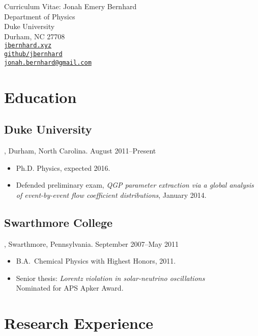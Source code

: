 \documentclass[letterpaper,10pt]{article}
\begin{document}
\begin{center}
  \Large
  Curriculum Vitae:  Jonah Emery Bernhard \\[1ex]
  \normalsize\rm
  Department of Physics \\
  Duke University \\
  Durham, NC 27708 \\[1ex]
  \href{http://jbernhard.xyz}{\nolinkurl{jbernhard.xyz}} \\
  \href{https://github.com/jbernhard}{\nolinkurl{github/jbernhard}} \\
  \href{mailto:jonah.bernhard@gmail.com}{\nolinkurl{jonah.bernhard@gmail.com}}
\end{center}


\section{Education}


\subsection{Duke University}, Durham, North Carolina. \hfill August 2011--Present

\begin{itemize}
  \item Ph.D. Physics, expected 2016.
  \item Defended preliminary exam, \emph{QGP parameter extraction via a global analysis of event-by-event flow coefficient distributions}, January 2014.
\end{itemize}


\subsection{Swarthmore College}, Swarthmore, Pennsylvania. \hfill September 2007--May 2011

\begin{itemize}
  \item B.A.\ Chemical Physics with Highest Honors, 2011.
  \item Senior thesis:  \emph{Lorentz violation in solar-neutrino oscillations} \\
          Nominated for APS Apker Award.
\end{itemize}



\section{Research Experience}
\end{document}
